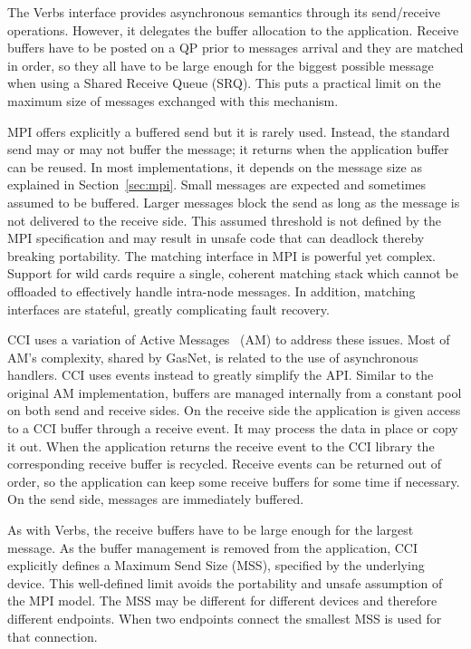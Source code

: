 The Verbs interface provides asynchronous semantics through its send/receive
operations. However, it delegates the buffer allocation to the application. 
Receive buffers have to be posted on a QP prior to messages arrival 
and they are matched in order, so they all have to be large enough for the 
biggest possible message when using a Shared Receive Queue (SRQ). 
This puts a practical limit on the maximum size of messages exchanged with 
this mechanism.

MPI offers explicitly a buffered send but it is rarely used. Instead, the 
standard send may or may not buffer the message; it returns when 
the application buffer can be reused. In most implementations, it 
depends on the message size as explained in Section~\ref{sec:mpi}. 
Small messages are expected and sometimes assumed to be buffered. Larger 
messages block the send as long as the message is not delivered to the receive 
side. This assumed threshold is not defined by the MPI 
specification and may result in unsafe code that can deadlock thereby breaking 
portability. 
The matching interface in MPI is powerful yet complex. Support 
for wild cards require a single, coherent matching stack which cannot be 
offloaded to effectively handle intra-node messages. In addition, matching 
interfaces are stateful,  greatly complicating fault recovery.

CCI uses a variation of Active Messages~\cite{voneicken-isca92} (AM) 
to address these issues. 
Most of AM's complexity, shared by GasNet\cite{gasnet}, is related 
to the use of asynchronous handlers. CCI uses events instead to greatly 
simplify the API. Similar to the original AM implementation, buffers are managed 
internally from a constant pool on both send and receive sides. 
On the receive side the application is given access to a CCI buffer through 
a receive event. It may process the data in place or copy it out. When the 
application returns the receive event to the CCI library the corresponding 
receive buffer is recycled. Receive events can be returned out of order, so 
the application can keep some receive buffers for some time if necessary. 
On the send side, messages are immediately buffered.

As with Verbs, the receive buffers have to be large enough for the largest 
message. As the buffer management is removed from the application, CCI 
explicitly defines a Maximum Send Size (MSS), specified by the underlying  
device. This well-defined limit avoids the portability and unsafe assumption 
of the MPI model. The MSS may be different for 
different devices and therefore different endpoints. When two endpoints 
connect the smallest MSS is used for that connection.

